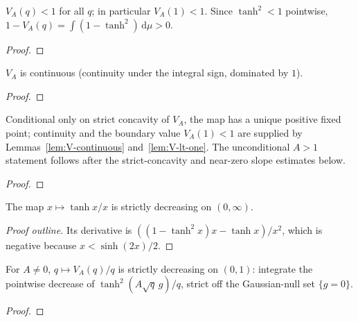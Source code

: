 \begin{lemma}[$V_A < 1$]
  \label{lem:V-lt-one}
  \leanok
  $V_A(q) < 1$ for all $q$; in particular $V_A(1)<1$. Since $\tanh^2<1$ pointwise,
  $1-V_A(q)=\int(1-\tanh^2)\,\mathrm d\mu>0$.
\end{lemma}
\begin{proof}\leanok{}\end{proof}

\begin{lemma}[$V_A$ continuous]
  \label{lem:V-continuous}
  \leanok
  $V_A$ is continuous (continuity under the integral sign, dominated by $1$).
\end{lemma}
\begin{proof}\leanok{}\end{proof}

\begin{theorem}
  \label{thm:V-fixed}
  \leanok
  Conditional only on strict concavity of $V_A$, the map has a unique positive fixed
  point; continuity and the boundary value $V_A(1)<1$ are supplied by
  Lemmas~\ref{lem:V-continuous} and~\ref{lem:V-lt-one}. The unconditional $A>1$
  statement follows after the strict-concavity and near-zero slope estimates below.
\end{theorem}
\begin{proof}\leanok{}\end{proof}

\begin{lemma}
  \label{lem:tanh-div}
  \leanok
  The map $x\mapsto \tanh x/x$ is strictly decreasing on $(0,\infty)$.
\end{lemma}
\begin{proof}[Proof outline]
  \leanok
  Its derivative is $((1-\tanh^2 x)x-\tanh x)/x^2$, which is negative because
  $x<\sinh(2x)/2$.
\end{proof}

\begin{lemma}
  \label{lem:V-ratio}
  \leanok
  For $A\neq0$, $q\mapsto V_A(q)/q$ is strictly decreasing on $(0,1)$: integrate the
  pointwise decrease of $\tanh^2(A\sqrt q\,g)/q$, strict off the Gaussian-null set
  $\{g=0\}$.
\end{lemma}
\begin{proof}\leanok{}\end{proof}

